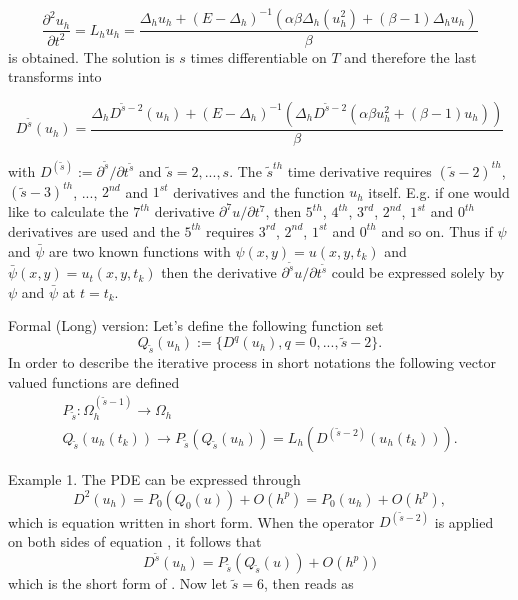 \documentclass[11pt,a4paper,twoside]{article}
\begin{document}
\begin{equation}\label{Leq}
\frac{ \partial^2 u_h }{ \partial t^2 } = L_h u_h = \frac{ \Delta_h u_h + (E - \Delta_h)^{-1} ( \alpha \beta \Delta_h( u_h^2) + (\beta -1)\Delta_h u_h) }{\beta}
\end{equation}
is obtained. The solution is $s$ times differentiable on $T$ and therefore the last transforms into

\begin{equation}\label{DLeq}
D^{\tilde s} (u_h) =\frac{ \Delta_h D^{\tilde s - 2}(u_h) + (E - \Delta_h)^{-1}( \Delta_h D^{\tilde s - 2} ( \alpha \beta u_h^2  + (\beta -1)u_h) )  }{\beta} 
\end{equation}

with $D^{(\tilde s)} := \partial^{\tilde s} / \partial t^{\tilde s}$ and $\tilde s = 2,...,s$. The $\tilde s^{th}$ time derivative requires $(\tilde s-2)^{th}$, $(\tilde s-3)^{th}$, ..., $2^{nd}$ and $1^{st}$ derivatives and the function $u_h$ itself. E.g. if one would like to calculate the $7^{th}$ derivative $\partial^7 u / \partial t^7$, then $5^{th}$, $4^{th}$, $3^{rd}$, $2^{nd}$, $1^{st}$ and $0^{th}$ derivatives are used and the $5^{th}$ requires  $3^{rd}$, $2^{nd}$, $1^{st}$ and $0^{th}$ and so on.  Thus if $\psi$ and $\bar \psi$ are two known functions with $\psi(x,y) = u(x,y, t_k)$ and $\bar \psi(x,y) = u_t(x,y, t_k)$ then the derivative $\partial^{\tilde s} u / \partial t^{\tilde s}$ could be expressed solely by $\psi$ and $\bar \psi$ at $t = t_k$.

\iffalse
Formal (Long) version:
Let's define the following function set
\begin{equation}
Q_{\tilde s}(u_h) := \{ D^{q}(u_h), q = 0, ... , \tilde s - 2 \}.
\end{equation}
In order to describe the iterative process in short notations the following vector valued functions are defined
\begin{align*} 
P_{\tilde s} : \Omega_h^{(\tilde s - 1)} \rightarrow \Omega_h
\\ Q_{\tilde s}(u_h(t_k)) \rightarrow P_{\tilde s} (Q_{\tilde s}(u_h) ) = L_h( D^{(\tilde s - 2)} (u_h(t_k)) ).
\end{align*}

Example 1. The PDE  can be expressed through 
\begin{equation}\label{example}
D^{2}(u_h) = P_0(Q_0(u)) + O(h^p) = P_0(u_h) + O(h^p),
\end{equation}
which is equation  written in short form. When the operator $D^{(\tilde s -2)}$ is applied on both sides of equation , it follows that
\begin{equation}\label{DPeq}
D^{\tilde s}(u_h) = P_{\tilde s}(Q_{\tilde s}(u)) + O(h^p))
\end{equation}
which is the short form of . Now let $\tilde s = 6$, then  reads as
\end{document}
